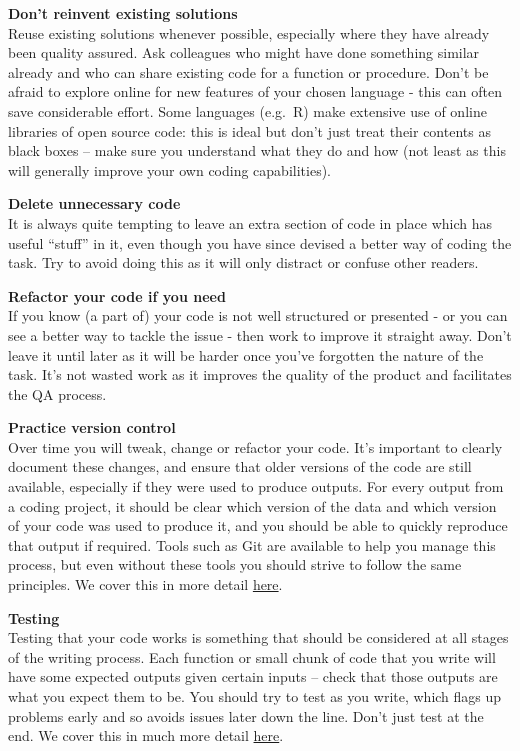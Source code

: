 \documentclass[
]{book}
\begin{document}
\textbf{Don't reinvent existing solutions}\\
Reuse existing solutions whenever possible, especially where they have already been quality assured. Ask colleagues who might have done something similar already and who can share existing code for a function or procedure. Don't be afraid to explore online for new features of your chosen language - this can often save considerable effort. Some languages (e.g.~R) make extensive use of online libraries of open source code: this is ideal but don't just treat their contents as black boxes -- make sure you understand what they do and how (not least as this will generally improve your own coding capabilities).

\textbf{Delete unnecessary code}\\
It is always quite tempting to leave an extra section of code in place which has useful ``stuff'' in it, even though you have since devised a better way of coding the task. Try to avoid doing this as it will only distract or confuse other readers.

\textbf{Refactor your code if you need}\\
If you know (a part of) your code is not well structured or presented - or you can see a better way to tackle the issue - then work to improve it straight away. Don't leave it until later as it will be harder once you've forgotten the nature of the task. It's not wasted work as it improves the quality of the product and facilitates the QA process.

\textbf{Practice version control}\\
Over time you will tweak, change or refactor your code. It's important to clearly document these changes, and ensure that older versions of the code are still available, especially if they were used to produce outputs. For every output from a coding project, it should be clear which version of the data and which version of your code was used to produce it, and you should be able to quickly reproduce that output if required. Tools such as Git are available to help you manage this process, but even without these tools you should strive to follow the same principles. We cover this in more detail \protect\hyperlink{VC}{here}.

\textbf{Testing}\\
Testing that your code works is something that should be considered at all stages of the writing process. Each function or small chunk of code that you write will have some expected outputs given certain inputs -- check that those outputs are what you expect them to be. You should try to test as you write, which flags up problems early and so avoids issues later down the line. Don't just test at the end. We cover this in much more detail \protect\hyperlink{testing}{here}.
\end{document}
